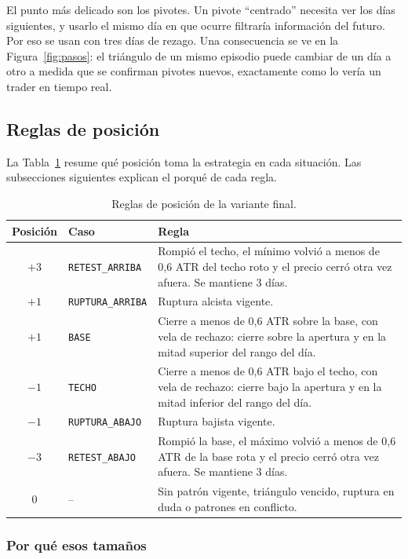 \documentclass[10pt,a4paper]{article}
\begin{document}
El punto más delicado son los pivotes. Un pivote ``centrado'' necesita ver los días
siguientes, y usarlo el mismo día en que ocurre filtraría información del futuro. Por
eso se usan con tres días de rezago. Una consecuencia se ve en la
Figura~\ref{fig:pasos}: el triángulo de un mismo episodio puede cambiar de un día a otro
a medida que se confirman pivotes nuevos, exactamente como lo vería un trader en tiempo
real.

\subsection{Reglas de posición}\label{sec:posicion}

La Tabla~\ref{tab:reglas} resume qué posición toma la estrategia en cada situación.
Las subsecciones siguientes explican el porqué de cada regla.

\begin{table}[htb]\centering\small
\renewcommand{\arraystretch}{1.1}
\begin{tabularx}{\textwidth}{@{}cl>{\raggedright\arraybackslash}X@{}}
\toprule
Posición & Caso & Regla \\
\midrule
$+3$ & \texttt{RETEST\_ARRIBA} & Rompió el techo, el mínimo volvió a menos de 0,6 ATR del techo roto y el precio cerró otra vez afuera. Se mantiene 3 días. \\
$+1$ & \texttt{RUPTURA\_ARRIBA} & Ruptura alcista vigente. \\
$+1$ & \texttt{BASE} & Cierre a menos de 0,6 ATR sobre la base, con vela de rechazo: cierre sobre la apertura y en la mitad superior del rango del día. \\
$-1$ & \texttt{TECHO} & Cierre a menos de 0,6 ATR bajo el techo, con vela de rechazo: cierre bajo la apertura y en la mitad inferior del rango del día. \\
$-1$ & \texttt{RUPTURA\_ABAJO} & Ruptura bajista vigente. \\
$-3$ & \texttt{RETEST\_ABAJO} & Rompió la base, el máximo volvió a menos de 0,6 ATR de la base rota y el precio cerró otra vez afuera. Se mantiene 3 días. \\
$0$  & -- & Sin patrón vigente, triángulo vencido, ruptura en duda o patrones en conflicto. \\
\bottomrule
\end{tabularx}
\caption{Reglas de posición de la variante final.}\label{tab:reglas}
\end{table}

\subsubsection{Por qué esos tamaños}
\end{document}
